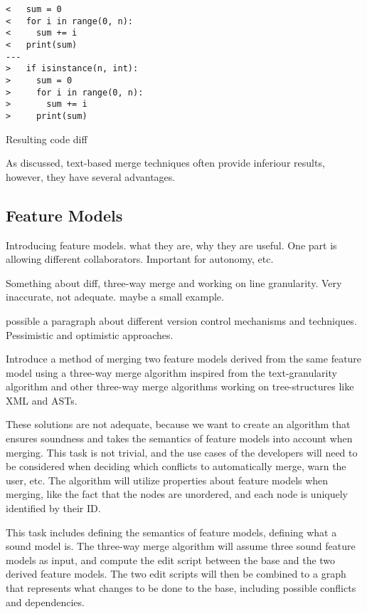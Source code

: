 \documentclass[a4paper,english]{ifimaster}
\begin{document}
\begin{listing}
	\begin{verbatim}
<   sum = 0
<   for i in range(0, n):
<     sum += i
<   print(sum)
---
>   if isinstance(n, int):
>     sum = 0
>     for i in range(0, n):
>       sum += i
>     print(sum)
  \end{verbatim}
	\caption{Resulting code diff}
	\label{lst:result_code_diff}
\end{listing}

As discussed, text-based merge techniques often provide inferiour results, however, they have several advantages.

\subsection{Feature Models}%
\label{sub:feature_models}

Introducing feature models. what they are, why they are useful. One part is allowing different collaborators. Important for autonomy, etc.

Something about diff, three-way merge and working on line granularity. Very inaccurate, not adequate. maybe a small example.

possible a paragraph about different version control mechanisms and techniques. Pessimistic and optimistic approaches. \parencite{cite:tom_mens_software_merging_survey}

Introduce a method of merging two feature models derived from the same feature model using a three-way merge algorithm inspired from the text-granularity algorithm and other three-way merge algorithms working on tree-structures like XML and ASTs.

These solutions are not adequate, because we want to create an algorithm that ensures soundness and takes the semantics of feature models into account when merging. This task is not trivial, and the use cases of the developers will need to be considered when deciding which conflicts to automatically merge, warn the user, etc. The algorithm will utilize properties about feature models when merging, like the fact that the nodes are unordered, and each node is uniquely identified by their ID.

This task includes defining the semantics of feature models, defining what a sound model is. The three-way merge algorithm will assume three sound feature models as input, and compute the edit script between the base and the two derived feature models. The two edit scripts will then be combined to a graph that represents what changes to be done to the base, including possible conflicts and dependencies.
\end{document}
